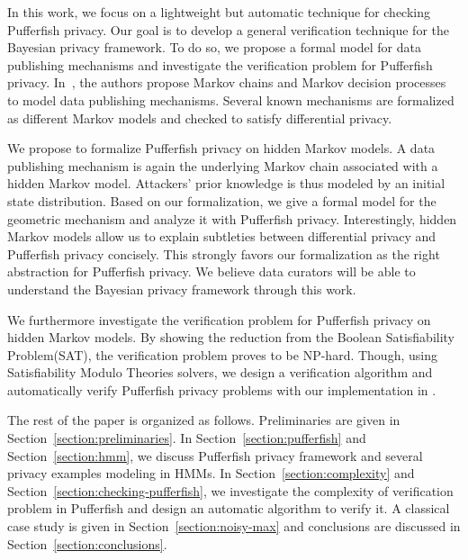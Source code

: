 
In this work, we focus on a lightweight but automatic technique for
checking Pufferfish privacy. Our goal is to develop a general
verification technique for the Bayesian privacy framework. To do so,
we propose a formal model for data publishing mechanisms and
investigate the verification problem for Pufferfish privacy.
In~\cite{LWZ:18:MCDPP}, the authors propose Markov chains and Markov
decision processes to model data publishing mechanisms. Several known
mechanisms are formalized as different Markov models and checked to
satisfy differential privacy.

We propose to formalize Pufferfish privacy on hidden Markov models. A
data publishing mechanism is again the underlying Markov
chain associated with a hidden Markov model. Attackers' prior
knowledge is thus modeled by an initial state distribution. Based on
our formalization, we give a formal model for the geometric mechanism
and analyze it with Pufferfish privacy. Interestingly, hidden Markov
models allow us to explain subtleties between differential privacy and
Pufferfish privacy concisely. This strongly favors our formalization
as the right abstraction for Pufferfish privacy. We believe data
curators will be able to understand the Bayesian privacy framework
through this work.

We furthermore investigate the verification problem for Pufferfish
privacy on hidden Markov models. By showing the reduction from the
Boolean Satisfiability Problem(SAT), the verification problem proves
to be NP-hard. Though, using Satisfiability Modulo Theories solvers,
we design a verification algorithm and automatically verify Pufferfish
privacy problems with our implementation in \zpython.

The rest of the paper is organized as follows. Preliminaries are given in
Section~\ref{section:preliminaries}. In Section~\ref{section:pufferfish}
and Section~\ref{section:hmm}, we discuss Pufferfish privacy framework
and several privacy examples modeling in HMMs. In Section~\ref{section:complexity}
and Section~\ref{section:checking-pufferfish}, we investigate the complexity
of verification problem in Pufferfish and design an automatic algorithm
to verify it. A classical case study is given in Section~\ref{section:noisy-max}
and conclusions are discussed in Section~\ref{section:conclusions}.


